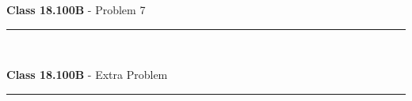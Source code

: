 \documentclass[11pt,reqno]{article}
\begin{document}
\vspace{15pt}
\begin{flushleft} 
\textbf{Class 18.100B} - Problem 7\\
\rule{500pt}{1pt}\\
\end{flushleft} 


\vspace{15pt}
\begin{flushleft} 
\textbf{Class 18.100B} - Extra Problem \\
\rule{500pt}{1pt}\\
\end{flushleft} 
\end{document}
